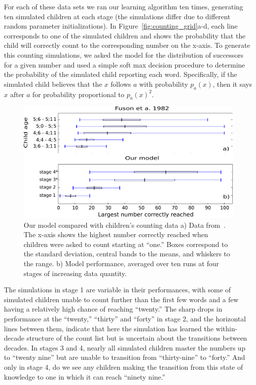 \documentclass[10pt,letterpaper]{article}
\begin{document}
For each of these data sets we ran our learning algorithm ten times,
generating ten simulated children at each stage (the simulations
differ due to different random parameter initializations). In
Figure~\ref{fig:counting_grid}a-d, each line corresponds to one of the
simulated children and shows the probability that the child will
correctly count to the corresponding number on the x-axis. To generate
this counting simulations, we asked the model for the distribution of
successors for a given number and used a simple soft max decision
procedure to determine the probability of the simulated child
reporting each word. Specifically, if the simulated child believes
that the $x$ follows $a$ with probability $p_a(x)$, then it says $x$
after $a$ for probability proportional to $p_a(x)^2 $.

\begin{figure}[t]
  \includegraphics[width=0.9\linewidth]{figures/modelboxplot.pdf}
  \caption{Our model compared with children's counting data a) Data
    from~\citet{FusRicBriar1982}. The x-axis shows the highest number
    correctly reached when children were asked to count starting at
    ``one.'' Boxes correspond to the standard deviation, central bands
    to the means, and whiskers to the range. b) Model performance,
    averaged over ten runs at four stages of increasing data
    quantity.}\label{fig:fuson_model_comparison}
\end{figure}


The simulations in stage 1 are variable in their performances, with
some of simulated children unable to count further than the first few
words and a few having a relatively high chance of reaching
``twenty.'' The sharp drops in performance at the ``twenty,'' ``thirty''
and ``forty'' in stage 2, and the horizontal lines between them,
indicate that here the simulation has learned the within-decade
structure of the count list but is uncertain about the transitions
between decades. In stages 3 and 4, nearly all simulated children
master the numbers up to ``twenty nine'' but are unable to transition from
``thirty-nine'' to ``forty.'' And only in stage 4, do we see any
children making the transition from this state of knowledge to one in
which it can reach ``ninety nine.'' 
\end{document}
